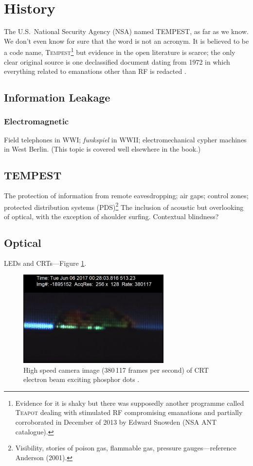 \documentclass[a4paper,twoside]{book}
\begin{document}
\section{History}
The U.S.\ National Security Agency (NSA) named TEMPEST, as far as we know. We
don't even know for sure that the word is not an acronym. It is believed to
be a code name, \textsc{Tempest}\footnote{Evidence for it is shaky but there
was supposedly another programme called \textsc{Teapot} dealing with
stimulated RF compromising emanations \cite[p.~539]{Anderson2008a} and
partially corroborated in December of 2013 by Edward Snowden (NSA ANT
catalogue).} but evidence in the open literature is scarce; the only clear
original source is one declassified document dating from 1972 in which
everything related to emanations other than RF is redacted
\cite{NSAtempest2007}.
\subsection{Information Leakage}
\subsubsection{Electromagnetic}
Field telephones in WWI; {\it funkspiel} in WWII; electromechanical cypher
machines in West Berlin. (This topic is covered well elsewhere in the book.)
\subsection{TEMPEST}
The protection of information from remote eavesdropping; air gaps; control
zones; protected distribution systems (PDS)\footnote{Visibility, stories of
poison gas, flammable gas, pressure gauges---reference Anderson (2001).} The
inclusion of acoustic but overlooking of optical, with the exception of
shoulder surfing. Contextual blindness?
\subsection{Optical}
LEDs and CRTs---Figure \ref{figure:slow-mo_guys_crt}.
\begin{figure}[ht]
  \centering
  \includegraphics[width=3in]{slow-mo_guys_crt.png}
  \caption{High speed camera image (380\,117 frames per second) of CRT electron
    beam exciting phosphor dots \protect\cite{Free2018}.}
  \label{figure:slow-mo_guys_crt}
\end{figure}
\end{document}
